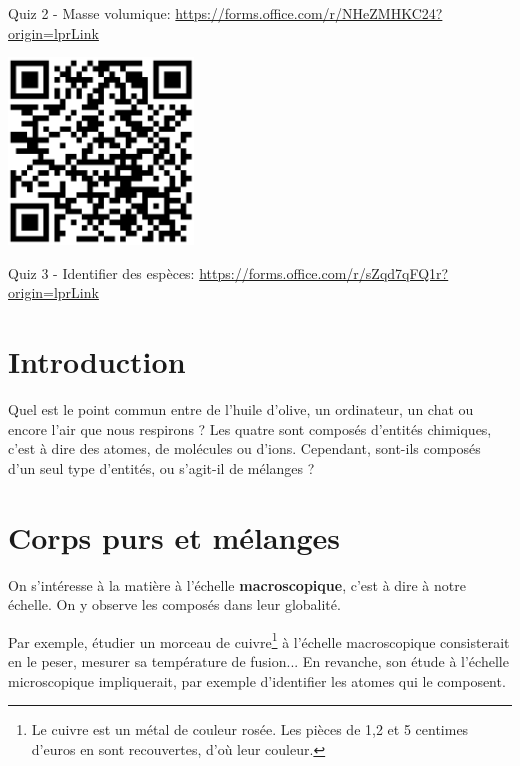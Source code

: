 \documentclass[french, a4paper, 12pt, twocolumn, landscape]{article}
\begin{document}
\begin{center}
\begin{minipage}{.12\textwidth}
		Quiz 2 - Masse volumique: \url{https://forms.office.com/r/NHeZMHKC24?origin=lprLink}
	\end{minipage}\hspace{.5cm}
\begin{minipage}{.12\textwidth}
			\centering
			\includegraphics[width=.5\textwidth]{Quiz3.png}
	
			Quiz 3 - Identifier des espèces: \url{https://forms.office.com/r/sZqd7qFQ1r?origin=lprLink}
		\end{minipage}
\end{center}


\section*{Introduction}

Quel est le point commun entre de l'huile d'olive, un ordinateur, un chat ou encore l'air que nous respirons ? Les quatre sont composés d'entités chimiques, c'est à dire des atomes, de molécules ou d'ions. Cependant, sont-ils composés d'un seul type d'entités, ou s'agit-il de mélanges ? 

\vspace{-.5cm}
\section{Corps purs et mélanges}

On s'intéresse à la matière à l'échelle \textbf{macroscopique}, c'est à dire à notre échelle. On y observe les composés dans leur globalité.\medskip

Par exemple, étudier un morceau de cuivre\footnote{Le cuivre est un métal de couleur rosée. Les pièces de 1,2 et 5 centimes d'euros en sont recouvertes, d'où leur couleur.} à l'échelle macroscopique consisterait en le peser, mesurer sa température de fusion... En revanche, son étude à l'échelle microscopique impliquerait, par exemple d'identifier les atomes qui le composent.
\end{document}
